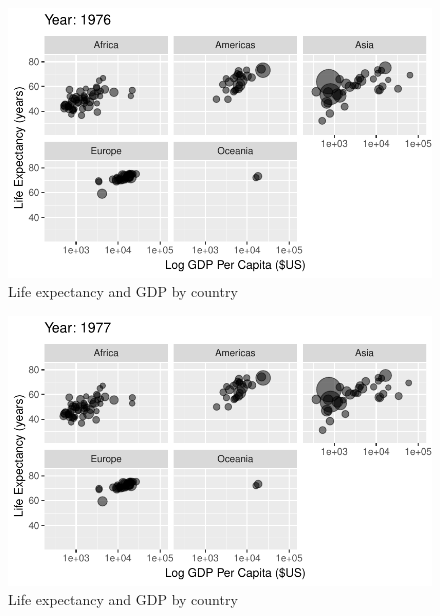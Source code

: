 \documentclass[
  letterpaper,
  DIV=11,
  numbers=noendperiod]{scrreport}
\theoremstyle{definition}
\theoremstyle{remark}
\begin{document}
\begin{figure}

{\centering \includegraphics{index_files/figure-pdf/fig-anim-lifegdp-45.pdf}

}

\caption{\label{fig-anim-lifegdp-45}Life expectancy and GDP by country}

\end{figure}

\begin{figure}

{\centering \includegraphics{index_files/figure-pdf/fig-anim-lifegdp-46.pdf}

}

\caption{\label{fig-anim-lifegdp-46}Life expectancy and GDP by country}

\end{figure}
\end{document}

